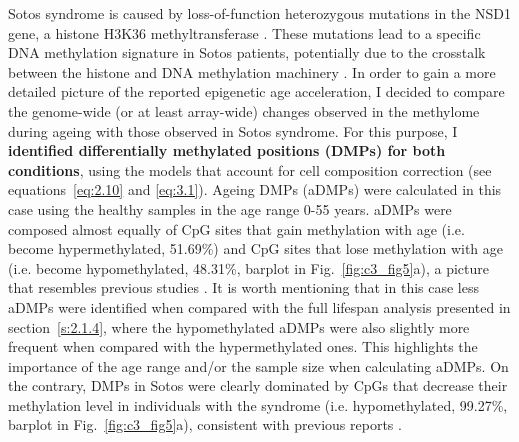 Sotos syndrome is caused by loss-of-function heterozygous mutations in the NSD1 gene, a histone H3K36 methyltransferase \cite{Choufani2015, Kurotaki2002}. These mutations lead to a specific DNA methylation signature in Sotos patients, potentially due to the crosstalk between the histone and DNA methylation machinery \cite{Choufani2015}. In order to gain a more detailed picture of the reported epigenetic age acceleration, I decided to compare the genome-wide (or at least array-wide) changes observed in the methylome during ageing with those observed in Sotos syndrome. For this purpose, I \textbf{identified differentially methylated positions (DMPs) for both conditions}, using the models that account for cell composition correction (see equations~\ref{eq:2.10} and \ref{eq:3.1}). Ageing DMPs (aDMPs) were calculated in this case using the healthy samples in the age range 0-55 years. aDMPs were composed almost equally of CpG sites that gain methylation with age (i.e. become hypermethylated, 51.69\%) and CpG sites that lose methylation with age (i.e. become hypomethylated, 48.31\%, barplot in Fig.~\ref{fig:c3_fig5}a), a picture that resembles previous studies \cite{Zhu2018}. It is worth mentioning that in this case less aDMPs were identified when compared with the full lifespan analysis presented in section~\ref{s:2.1.4}, where the hypomethylated aDMPs were also slightly more frequent when compared with the hypermethylated ones. This highlights the importance of the age range and/or the sample size when calculating aDMPs. On the contrary, DMPs in Sotos were clearly dominated by CpGs that decrease their methylation level in individuals with the syndrome (i.e. hypomethylated, 99.27\%, barplot in Fig.~\ref{fig:c3_fig5}a), consistent with previous reports \cite{Choufani2015}.

